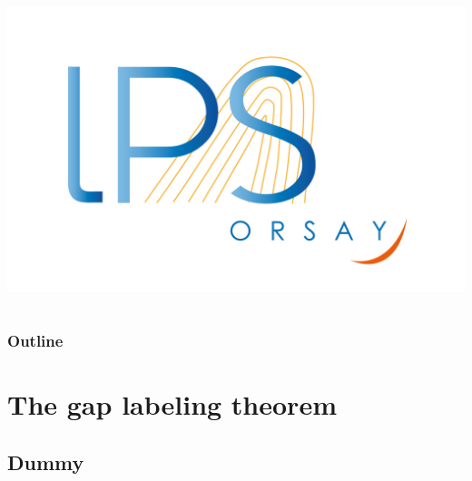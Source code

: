 \documentclass[xcolor=x11names,compress,professionalfonts]{beamer}
\renewcommand{\(}{\begin{columns}}
\renewcommand{\)}{\end{columns}}
\newcommand{\<}[1]{\begin{column}{#1}}
\renewcommand{\>}{\end{column}}
\begin{document}
\begin{frame}
\begin{columns}
\begin{column}{2cm}
~\\
~\\
~\\
~\\
\raggedleft
\includegraphics[scale=.15]{img/logo-lps.jpg}
\end{column}
\end{columns}
\end{frame}

\begin{frame}
\frametitle{Outline}
\tableofcontents[hideallsubsections]
\end{frame}

\section{The gap labeling theorem}
\subsection{Dummy}
\end{document}
